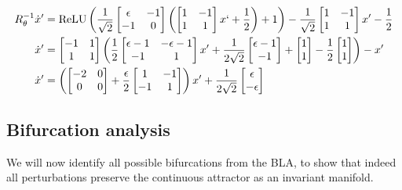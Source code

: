 \documentclass{article} %
\newcounter{ct}
\theoremstyle{definition}
\theoremstyle{remark}
\begin{document}
\begin{align}
R_{\theta}^{-1}\dot x' &= \operatorname{ReLU}\left(\frac{1}{\sqrt{2}}\begin{bmatrix}\epsilon &-1\\-1&0\end{bmatrix}\left(\begin{bmatrix}1 &-1\\1&1\end{bmatrix} x`+\frac{1}{2}\right)+1\right)-\frac{1}{\sqrt{2}}\begin{bmatrix}1 &-1\\1&1\end{bmatrix} x'-\frac{1}{2}\\
\dot x' &=\begin{bmatrix}-1 &1\\1&1\end{bmatrix}\left(\frac{1}{2}\begin{bmatrix}\epsilon-1 &-\epsilon-1\\-1&1\end{bmatrix}x' + \frac{1}{2\sqrt{2}}\begin{bmatrix}\epsilon-1 \\-1\end{bmatrix}+\begin{bmatrix}1 \\1\end{bmatrix}-\frac{1}{2}\begin{bmatrix}1 \\1\end{bmatrix}\right)-x'\\
\dot x' &=\left(\begin{bmatrix}-2 &0\\0&0\end{bmatrix}+\frac{\epsilon}{2}\begin{bmatrix}1 &-1\\-1&1\end{bmatrix}\right)x' + \frac{1}{2\sqrt{2}}\begin{bmatrix}\epsilon \\-\epsilon\end{bmatrix}
\end{align}

\subsection{Bifurcation analysis}
We will now identify all possible bifurcations from the BLA, to show that indeed all perturbations preserve the continuous attractor as an invariant manifold.
\end{document}
